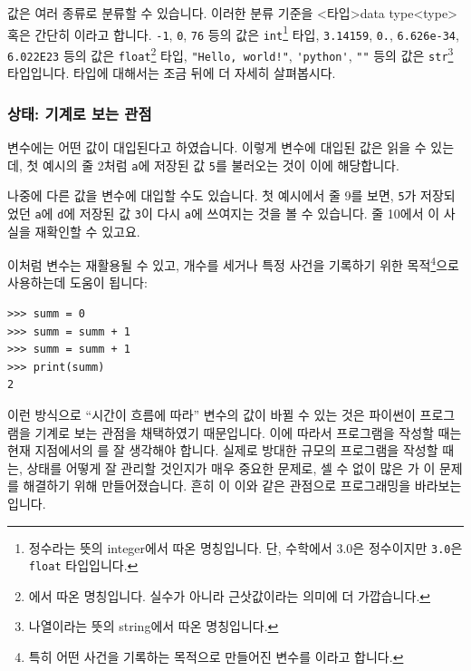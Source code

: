 \documentclass[../main.tex]{subfiles}
\begin{document}
값은 여러 종류로 분류할 수 있습니다.
이러한 분류 기준을 <타입>{data type}<type> 혹은 간단히 이라고 합니다.
\verb/-1/, \verb/0/, \verb/76/ 등의 값은 \verb/int/\footnote{정수라는 뜻의 integer에서 따온 명칭입니다. 단, 수학에서 3.0은 정수이지만 \texttt{3.0}은 \texttt{float} 타입입니다.} 타입, \verb/3.14159/, \verb/0./, \verb/6.626e-34/, \verb/6.022E23/ 등의 값은 \verb/float/\footnote{에서 따온 명칭입니다. 실수가 아니라 근삿값이라는 의미에 더 가깝습니다.} 타입, \verb/"Hello, world!"/, \verb/'python'/, \verb/""/ 등의 값은 \texttt{str}\footnote{나열이라는 뜻의 string에서 따온 명칭입니다.} 타입입니다.
타입에 대해서는 조금 뒤에 더 자세히 살펴봅시다.

\subsubsection{상태: 기계로 보는 관점}
변수에는 어떤 값이 대입된다고 하였습니다.
이렇게 변수에 대입된 값은 읽을 수 있는데, 첫 예시의 줄 2처럼 \verb/a/에 저장된 값 \verb/5/를 불러오는 것이 이에 해당합니다.

나중에 다른 값을 변수에 대입할 수도 있습니다.
첫 예시에서 줄 9를 보면, \verb/5/가 저장되었던 \verb/a/에 \verb/d/에 저장된 값 \verb/3/이 다시 \verb/a/에 쓰여지는 것을 볼 수 있습니다.
줄 10에서 이 사실을 재확인할 수 있고요.

이처럼 변수는 재활용될 수 있고, 개수를 세거나 특정 사건을 기록하기 위한 목적\footnote{특히 어떤 사건을 기록하는 목적으로 만들어진 변수를 이라고 합니다.}으로 사용하는데 도움이 됩니다:
\begin{verbatim}
>>> summ = 0
>>> summ = summ + 1
>>> summ = summ + 1
>>> print(summ)
2
\end{verbatim}

이런 방식으로 ``시간이 흐름에 따라'' 변수의 값이 바뀔 수 있는 것은 파이썬이 프로그램을 기계로 보는 관점을 채택하였기 때문입니다.
이에 따라서 프로그램을 작성할 때는 현재 지점에서의 를 잘 생각해야 합니다.
실제로 방대한 규모의 프로그램을 작성할 때는, 상태를 어떻게 잘 관리할 것인지가 매우 중요한 문제로, 셀 수 없이 많은 가 이 문제를 해결하기 위해 만들어졌습니다.
흔히 이 이와 같은 관점으로 프로그래밍을 바라보는 입니다.
\end{document}
